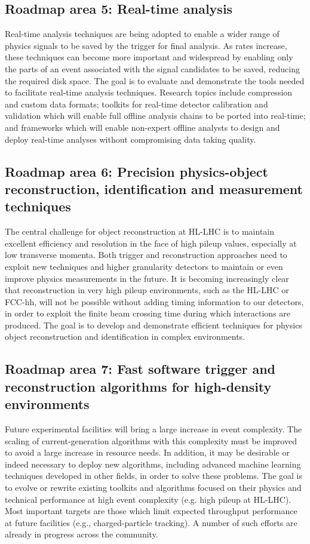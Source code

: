 \subsection*{Roadmap area 5: Real-time analysis }

Real-time analysis techniques are being adopted to enable a wider range of physics signals to be saved by the trigger for final analysis. As rates increase, these techniques can become more important and widespread by enabling only the parts of an event associated with the signal candidates to be saved, reducing the required disk space. The goal is to evaluate and demonstrate the tools needed to facilitate real-time analysis techniques. Research topics include compression and custom data formats; toolkits for real-time detector calibration and validation which will enable full offline analysis chains to be ported into real-time; and frameworks which will enable non-expert offline analysts to design and deploy real-time analyses without compromising data taking quality. 

\subsection*{Roadmap area 6: Precision physics-object reconstruction, identification and measurement techniques}

The central challenge for object reconstruction at HL-LHC is to maintain excellent efficiency and resolution in the face of high pileup values, especially at low transverse momenta. Both trigger and reconstruction approaches need to exploit new techniques and higher granularity detectors to maintain or even improve physics measurements in the future. It is becoming increasingly clear that reconstruction in very high pileup environments, such as the HL-LHC or FCC-hh, will not be possible without adding timing information to our detectors, in order to exploit the finite beam crossing time during which interactions are produced. The goal is to develop and demonstrate efficient techniques for physics object reconstruction and identification in complex environments.

\subsection*{Roadmap area 7: Fast software trigger and reconstruction algorithms for high-density environments }

Future experimental facilities will bring a large increase in event complexity. The scaling of current-generation algorithms with this complexity must be improved to avoid a large increase in resource needs. In addition, it may be desirable or indeed necessary to deploy new algorithms, including advanced machine learning techniques developed in other fields, in order to solve these problems. The goal is to evolve or rewrite existing toolkits and algorithms focused on their physics and technical performance at high event complexity (e.g. high pileup at HL-LHC). Most important targets are those which limit expected throughput performance at future facilities (e.g., charged-particle tracking). A number of such efforts are already in progress across the community.

